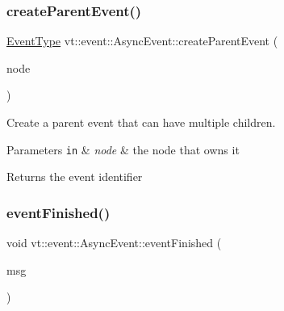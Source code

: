 \subsubsection{\texorpdfstring{create\+Parent\+Event()}{createParentEvent()}}
{\footnotesize\ttfamily \hyperlink{namespacevt_a009267401def7ae8bf201892222d060f}{Event\+Type} vt\+::event\+::\+Async\+Event\+::create\+Parent\+Event (\begin{DoxyParamCaption}\item[{\hyperlink{namespacevt_a866da9d0efc19c0a1ce79e9e492f47e2}{Node\+Type} const \&}]{node }\end{DoxyParamCaption})}



Create a parent event that can have multiple children. 


\begin{DoxyParams}[1]{Parameters}
\mbox{\tt in}  & {\em node} & the node that owns it\\
\hline
\end{DoxyParams}
\begin{DoxyReturn}{Returns}
the event identifier 
\end{DoxyReturn}
\mbox{\label{structvt_1_1event_1_1_async_event_a2228d79f1c1f838e630dcb3325edfde3}} 
\subsubsection{\texorpdfstring{event\+Finished()}{eventFinished()}}
{\footnotesize\ttfamily void vt\+::event\+::\+Async\+Event\+::event\+Finished (\begin{DoxyParamCaption}\item[{\hyperlink{structvt_1_1_event_finished_msg}{Event\+Finished\+Msg} $\ast$}]{msg }\end{DoxyParamCaption})\hspace{0.3cm}{\ttfamily [static]}}

\mbox{\label{structvt_1_1event_1_1_async_event_a77e3aafaae98603825556cdf8105ba57}} 
